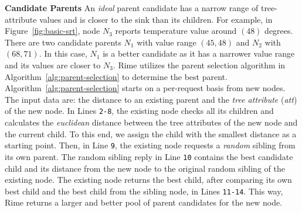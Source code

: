 \textbf{Candidate Parents}
An \textit{ideal} parent candidate has a narrow range of tree-attribute values and is closer to the 
sink than its children. For example, in Figure~\ref{fig:basic-srt}, node \textit{$N_{3}$} reports temperature value around \textit{$(48)$} degrees. There are two candidate parents \textit{$N_{1}$} with value range \textit{$(45, 48)$} and \textit{$N_{2}$} with \textit{$(68, 71)$}. In this case, \textit{$N_{1}$} is a better candidate as it has a narrower value range and its values are closer to \textit{$N_{3}$}.
%
Rime utilizes the parent selection algorithm in Algorithm~\ref{alg:parent-selection} to determine the best parent.
Algorithm~\ref{alg:parent-selection} starts on a per-request basis from new nodes. The input data are: the distance to an existing parent and the \textit{tree attribute} (\textit{att}) of the new node.
In Lines \texttt{2-8}, the existing node checks all its children and calculates the \textit{euclidean} distance between the tree attributes of the new node and the current child. To this end, we assign the child with the smallest distance as a starting point.
Then, in Line \texttt{9}, the existing
node requests a \textit{random} sibling from its own parent.
The random sibling reply in Line \texttt{10} contains the best candidate child and its distance from the new node to the original random sibling of the existing node. The existing node returns the best child, after comparing its own best child and the best child from the sibling node, in Lines \texttt{11-14}.
This way, Rime returns a larger and better pool of parent candidates for the new node.


